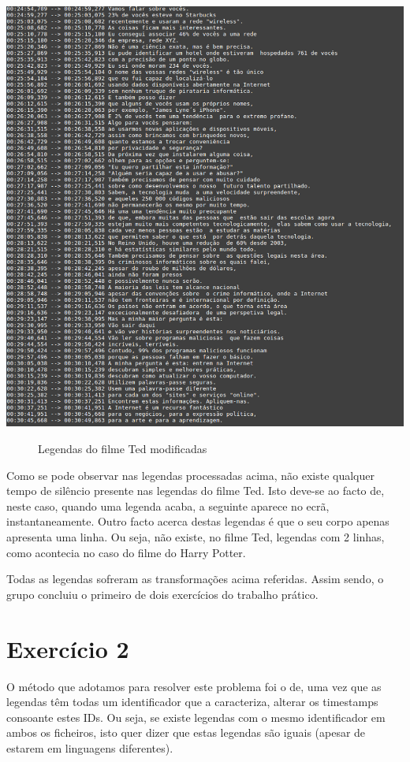 \documentclass[a4paper]{article}
\begin{document}
\begin{center}
	\includegraphics[scale=0.45]{7}
	\begin{figure}[!h]
	\caption{Legendas do filme Ted modificadas}
	\end{figure}
\end{center}



Como se pode observar nas legendas processadas acima, não existe qualquer tempo de silêncio presente nas legendas do filme Ted. Isto deve-se ao facto de, neste caso, quando uma legenda acaba, a seguinte aparece no ecrã, instantaneamente.
Outro facto acerca destas legendas é que o seu corpo apenas apresenta uma linha. Ou seja, não existe, no filme Ted, legendas com 2 linhas, como acontecia no caso do filme do Harry Potter.


Todas as legendas sofreram as transformações acima referidas. 
Assim sendo, o grupo concluiu o primeiro de dois exercícios do trabalho prático. 


\section{Exercício 2}
\label{sec:ex2}

O método que adotamos para resolver este problema foi o de, uma vez que as legendas têm todas um identificador que a caracteriza, alterar os timestamps consoante estes IDs.
Ou seja, se existe legendas com o mesmo identificador em ambos os ficheiros, isto quer dizer que estas legendas são iguais (apesar de estarem em linguagens diferentes).
\end{document}
